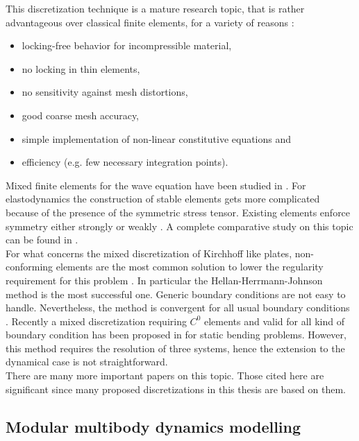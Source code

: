 This discretization technique is a mature research topic, that is rather advantageous over classical finite elements, for a variety of reasons \cite{wriggers2009}:
\begin{itemize}
	\item locking-free behavior for incompressible material,
	\item no locking in thin elements,
	\item no sensitivity against mesh distortions,
	\item good coarse mesh accuracy, 
	\item simple implementation of non-linear constitutive equations and
	\item efficiency (e.g. few necessary integration points).
\end{itemize}

Mixed finite elements for the wave equation have been studied in \cite{geveci1988,becache2000wave}. For elastodynamics the construction of stable elements gets more complicated because of the presence of the symmetric stress tensor. Existing elements enforce symmetry either strongly \cite{becache2001elas,arnold2002mixed} or weakly \cite{arnold2007mixed,arnold2014elastodynamics}. A complete comparative study on this topic can be found in \cite{lee2012mixed}. \\

For what concerns the mixed discretization of Kirchhoff like plates, non-conforming elements are the most common solution to lower the regularity requirement for this problem \cite{arnold1990intro}. In particular the Hellan-Herrmann-Johnson method \cite{hellan1967,herrmann1967finite,johnson1973convergence} is the most successful one. Generic boundary conditions are not easy to handle. Nevertheless, the method is convergent for all usual boundary conditions \cite{blum1990}. Recently a mixed discretization requiring $C^0$ elements and valid for all kind of boundary condition has been proposed in \cite{rafetseder2018siam} for static bending problems. However, this method requires the resolution of three systems, hence the extension to the dynamical case is not straightforward. \\

There are many more important papers on this topic. Those cited here are significant since many proposed discretizations in this thesis are based on them.

 
\subsection{Modular multibody dynamics modelling}

